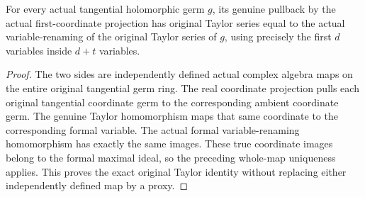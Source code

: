 \begin{theorem}
\label{hir:actual-original-taylor-tangent-coordinate-naturality}
\leanok
For every actual tangential holomorphic germ $g$, its genuine pullback by
the actual first-coordinate projection has original Taylor series equal
to the actual variable-renaming of the original Taylor series of $g$,
using precisely the first $d$ variables inside $d+t$ variables.
\end{theorem}
\begin{proof}
The two sides are independently defined actual complex algebra maps on the
entire original tangential germ ring. The real coordinate projection pulls
each original tangential coordinate germ to the corresponding ambient
coordinate germ. The genuine Taylor homomorphism maps that same coordinate
to the corresponding formal variable. The actual formal variable-renaming
homomorphism has exactly the same images. These true coordinate images
belong to the formal maximal ideal, so the preceding whole-map uniqueness
applies. This proves the exact original Taylor identity without replacing
either independently defined map by a proxy.
\end{proof}
